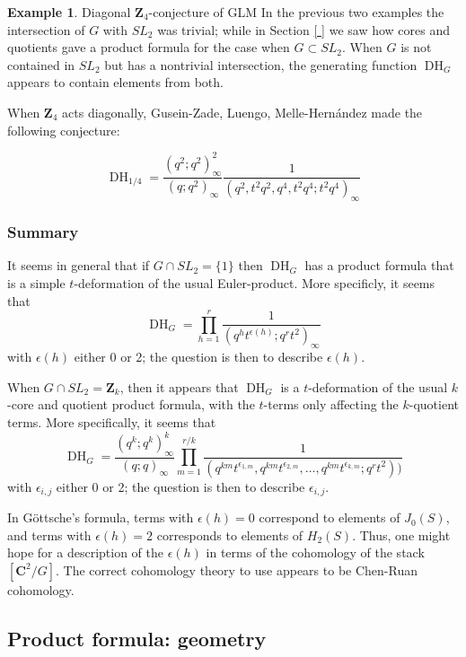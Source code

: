 \documentclass{amsart}[12pt]
\theoremstyle{definition}
\newtheorem{example}[dummy]{Example}
\newcommand{\Z}{\mathbf{Z}}
\newcommand{\C}{\mathbf{C}}
\DeclareMathOperator{\DC}{DH}
\begin{document}
\begin{example}{Diagonal $\Z_4$-conjecture of GLM}
In the previous two examples the intersection of $G$ with $SL_2$ was trivial; while in Section \ref{ } we saw how cores and quotients gave a product formula for the case when $G\subset SL_2$.  When $G$ is not contained in $SL_2$ but has a nontrivial intersection, the generating function $\DC_G$ appears to contain elements from both.

When $\Z_4$ acts diagonally, Gusein-Zade, Luengo, Melle-Hern\'andez made the following conjecture:

$$\DC_{1/4}=\frac{(q^2;q^2)^2_\infty}{(q;q^2)_\infty} \frac{1}{(q^2, t^2q^2, q^4, t^2q^4;t^2q^4)_\infty}$$

\end{example}






\subsubsection{Summary}
It seems in general that if $G\cap SL_2=\{1\}$ then $\DC_G$ has a product formula that is a simple $t$-deformation of the usual Euler-product.  More specificly, it seems that
$$\DC_{G}=\prod_{h=1}^r \frac{1}{(q^h t^{\epsilon(h)}; q^r t^2)_\infty}$$
with $\epsilon(h)$ either 0 or 2; the question is then to describe $\epsilon(h)$.

When $G\cap SL_2=\Z_k$, then it appears that $\DC_G$ is a $t$-deformation of the usual $k$-core and quotient product formula, with the $t$-terms only affecting the $k$-quotient terms.  More specifically, it seems that
$$\DC_G=\frac{(q^k;q^k)^k_\infty}{(q;q)_\infty}
\prod_{m=1}^{r/k}\frac{1}{(q^{km}t^{\epsilon_{1,m}},q^{km}t^{\epsilon_{2,m}},\dots,q^{km}t^{\epsilon_{k,m}} ;q^rt^2))}$$
with $\epsilon_{i,j}$ either 0 or 2; the question is then to describe $\epsilon_{i,j}$.


In G\"ottsche's formula, terms with $\epsilon(h)=0$ correspond to elements of $J_0(S)$, and terms with $\epsilon(h)=2$ corresponds to elements of $H_2(S)$. Thus, one might hope for a description of the $\epsilon(h)$ in terms of the cohomology of the stack $[\C^2/G]$.  The correct cohomology theory to use appears to be Chen-Ruan cohomology.

\subsection{Product formula: geometry}
\label{sec:prod-CR}
\end{document}
